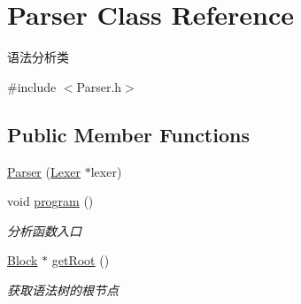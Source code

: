 \hypertarget{class_parser}{}\section{Parser Class Reference}
\label{class_parser}


语法分析类  




{\ttfamily \#include $<$Parser.\+h$>$}

\subsection*{Public Member Functions}
\begin{DoxyCompactItemize}
\item 
\hyperlink{class_parser_a25929f4bcec5c5ff010218f001203b73}{Parser} (\hyperlink{class_lexer}{Lexer} $\ast$lexer)
\item 
\mbox{\label{class_parser_af213985eb12738d0dbf7d505a8795ea2}} 
void \hyperlink{class_parser_af213985eb12738d0dbf7d505a8795ea2}{program} ()
\begin{DoxyCompactList}\small\item\em 分析函数入口 \end{DoxyCompactList}\item 
\mbox{\label{class_parser_ad05b2f1f2e9f60a7373961da0588eb5b}} 
\hyperlink{class_block}{Block} $\ast$ \hyperlink{class_parser_ad05b2f1f2e9f60a7373961da0588eb5b}{get\+Root} ()
\begin{DoxyCompactList}\small\item\em 获取语法树的根节点 \end{DoxyCompactList}\end{DoxyCompactItemize}
